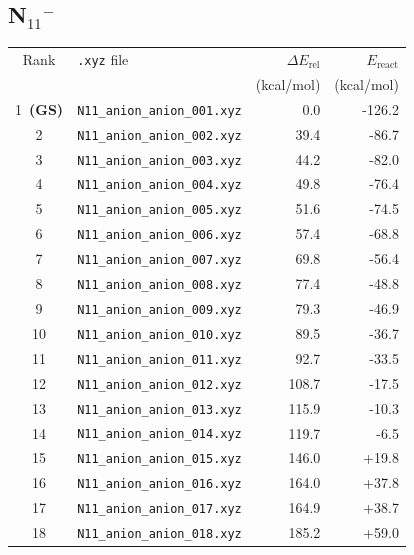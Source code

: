 \documentclass[11pt,a4paper]{article}
\begin{document}
\subsection*{N$_{11}$$^{-}$}
\begin{longtable}{clrr}
\toprule
Rank & \texttt{.xyz} file & $\Delta E_\text{rel}$ & $E_\text{react}$ \\
 & & (kcal/mol) & (kcal/mol) \\
\midrule\endhead
\rowcolor{gs}1~\textbf{(GS)} & \texttt{N11\_anion\_anion\_001.xyz} & 0.0 & -126.2 \\
2 & \texttt{N11\_anion\_anion\_002.xyz} & 39.4 & -86.7 \\
3 & \texttt{N11\_anion\_anion\_003.xyz} & 44.2 & -82.0 \\
4 & \texttt{N11\_anion\_anion\_004.xyz} & 49.8 & -76.4 \\
5 & \texttt{N11\_anion\_anion\_005.xyz} & 51.6 & -74.5 \\
6 & \texttt{N11\_anion\_anion\_006.xyz} & 57.4 & -68.8 \\
7 & \texttt{N11\_anion\_anion\_007.xyz} & 69.8 & -56.4 \\
8 & \texttt{N11\_anion\_anion\_008.xyz} & 77.4 & -48.8 \\
9 & \texttt{N11\_anion\_anion\_009.xyz} & 79.3 & -46.9 \\
10 & \texttt{N11\_anion\_anion\_010.xyz} & 89.5 & -36.7 \\
11 & \texttt{N11\_anion\_anion\_011.xyz} & 92.7 & -33.5 \\
12 & \texttt{N11\_anion\_anion\_012.xyz} & 108.7 & -17.5 \\
13 & \texttt{N11\_anion\_anion\_013.xyz} & 115.9 & -10.3 \\
14 & \texttt{N11\_anion\_anion\_014.xyz} & 119.7 & -6.5 \\
15 & \texttt{N11\_anion\_anion\_015.xyz} & 146.0 & +19.8 \\
16 & \texttt{N11\_anion\_anion\_016.xyz} & 164.0 & +37.8 \\
17 & \texttt{N11\_anion\_anion\_017.xyz} & 164.9 & +38.7 \\
18 & \texttt{N11\_anion\_anion\_018.xyz} & 185.2 & +59.0 \\
\bottomrule
\end{longtable}
\end{document}
